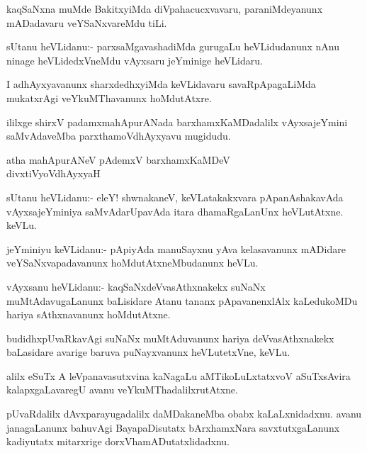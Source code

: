 \begin{mng}
kaqSaNxna muMde BakitxyiMda diVpahacucxvavaru, paraniMdeyanunx mADadavaru veYSaNxvareMdu tiLi.
\end{mng}

\begin{mng}
sUtanu heVLidanu:- parxsaMgavashadiMda gurugaLu heVLidudanunx nAnu ninage heVLidedxVneMdu vAyxsaru jeYminige heVLidaru.
\end{mng}

\begin{mng}
I adhAyxyavanunx sharxdedhxyiMda keVLidavaru savaRpApagaLiMda mukatxrAgi veYkuMThavanunx hoMdutAtxre.
\end{mng}
ililxge shirxV padamxmahApurANada barxhamxKaMDadalilx vAyxsajeYmini saMvAdaveMba parxthamoVdhAyxyavu mugidudu.

\begin{center}
atha mahApurANeV pAdemxV barxhamxKaMDeV\\
divxtiVyoVdhAyxyaH
\end{center}

\begin{mng}
sUtanu heVLidanu:- eleY! shwnakaneV, keVLatakakxvara pApanAshakavAda vAyxsajeYminiya saMvAdarUpavAda itara dhamaRgaLanUnx heVLutAtxne. keVLu.
\end{mng}

\begin{mng}
jeYminiyu keVLidanu:- pApiyAda manuSayxnu yAva kelasavanunx mADidare veYSaNxvapadavanunx hoMdutAtxneMbudanunx heVLu.
\end{mng}

\begin{mng}
vAyxsanu heVLidanu:- kaqSaNxdeVvasAthxnakekx suNaNx muMtAdavugaLanunx baLisidare Atanu tananx pApavanenxlAlx kaLedukoMDu hariya sAthxnavanunx hoMdutAtxne.
\end{mng}

\begin{mng}
budidhxpUvaRkavAgi suNaNx muMtAduvanunx hariya deVvasAthxnakekx baLasidare avarige baruva puNayxvanunx heVLutetxVne, keVLu.
\end{mng}

\begin{mng}
alilx eSuTx A leVpanavasutxvina kaNagaLu aMTikoLuLxtatxvoV aSuTxsAvira kalapxgaLavaregU avanu veYkuMThadalilxrutAtxne.
\end{mng}

\begin{mng}
pUvaRdalilx dAvxparayugadalilx daMDakaneMba obabx kaLaLxnidadxnu. avanu janagaLanunx bahuvAgi BayapaDisutatx bArxhamxNara savxtutxgaLanunx kadiyutatx mitarxrige dorxVhamADutatxlidadxnu.
\end{mng}

